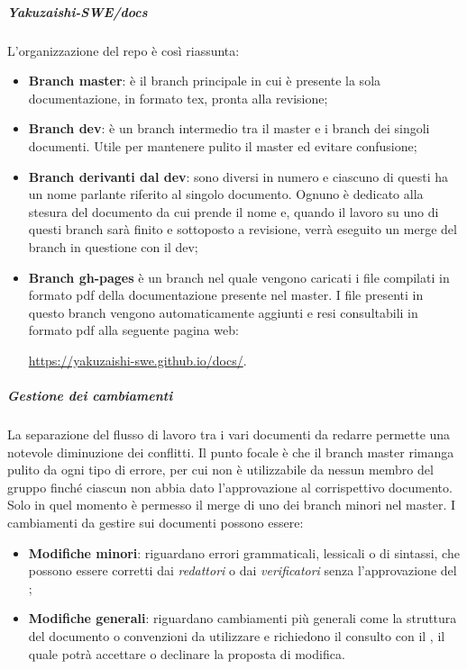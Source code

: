 \subparagraph{Yakuzaishi-SWE/docs}
L'organizzazione del repo è così riassunta:
\begin{itemize}
    \item \textbf{Branch\glo{} master}: è il branch\glo{} principale in cui è presente la sola documentazione, in formato tex, pronta alla revisione;
    \item \textbf{Branch\glo{} dev}: è un branch\glo{} intermedio tra il master e i branch\glo{} dei singoli documenti. Utile per mantenere pulito il master ed evitare confusione;
    \item \textbf{Branch\glo{} derivanti dal dev}: sono diversi in numero e ciascuno di questi ha un nome parlante riferito al singolo documento. Ognuno è dedicato alla stesura del documento da cui prende il nome e, quando il lavoro su uno di questi branch\glo{} sarà finito e sottoposto a revisione, verrà eseguito un merge\glo{} del branch\glo{} in questione con il dev;
    \item \textbf{Branch\glo{} gh-pages} è un branch\glo{} nel quale vengono caricati i file compilati in formato pdf della documentazione presente nel master. I file presenti in questo branch\glo{} vengono automaticamente aggiunti e resi consultabili in formato pdf alla seguente pagina web:
          \begin{center}
              \url{https://yakuzaishi-swe.github.io/docs/}.
          \end{center}
\end{itemize}

\subparagraph*{Gestione dei cambiamenti}
La separazione del flusso di lavoro tra i vari documenti da redarre permette una notevole diminuzione dei conflitti. Il punto focale è che il branch\glo{} master rimanga pulito da ogni tipo di errore, per cui non è utilizzabile da nessun membro del gruppo finché ciascun \roleProjectManagerLow{} non abbia dato l'approvazione al corrispettivo documento. Solo in quel momento è permesso il merge\glo{} di uno dei branch\glo{} minori nel master. I cambiamenti da gestire sui documenti possono essere:
\begin{itemize}
    \item \textbf{Modifiche minori}: riguardano errori grammaticali, lessicali o di sintassi, che possono essere corretti dai \textit{redattori} o dai \textit{verificatori} senza l'approvazione del \roleProjectManagerLow;
    \item \textbf{Modifiche generali}: riguardano cambiamenti più generali come la struttura del documento o convenzioni da utilizzare e richiedono il consulto con il \roleProjectManagerLow, il quale potrà accettare o declinare la proposta di modifica.
\end{itemize}



